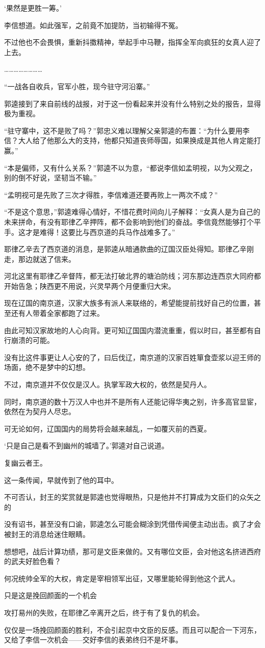 ‘果然是更胜一筹。’

李信想道。如此强军，之前竟不加提防，当初输得不冤。

不过他也不会畏惧，重新抖擞精神，举起手中马鞭，指挥全军向疯狂的女真人迎了上去。

……………………

“一战各自收兵，官军小胜，现今驻守河沿寨。”

郭逵接到了来自前线的战报，对于这一份看起来并没有什么特别之处的报告，显得极为重视。

“驻守寨中，这不是败了吗？”郭忠义难以理解父亲郭逵的布置：“为什么要用李信？大人给了他那么大的支持，他都只知道丧师辱国，如果换成是其他人肯定能打赢。”

“本是偏师，又有什么关系？”郭逵不以为意，“都说李信如孟明视，以为父观之，别的倒不好说，坚韧当不输。”

“孟明视可是先败了三次才得胜，李信难道还要再败上一两次不成？”

“不是这个意思，”郭逵难得心情好，不惜花费时间向儿子解释：“女真人是为自己的未来拼命，有没有耶律乙辛押阵，都不会影响到他们的奋战。李信竟然能够打个平手。这才是难得！这要比与西京道的兵马作战难多了。”

耶律乙辛去了西京道的消息，是郭逵从暗通款曲的辽国汉臣处得知。耶律乙辛刚走，那边就送了信来。

河北这里有耶律乙辛督阵，都无法打破北界的塘泊防线；河东那边连西京大同府都开始告急；陕西更不用说，兴灵早两个月便重归大宋。

现在辽国的南京道，汉家大族多有派人来联络的，希望能提前找好自己的位置，甚至还有人带着全家都跑了过来。

由此可知汉家故地的人心向背。更可知辽国国内潜流重重，假以时曰，甚至都有自行崩溃的可能。

没有比这件事更让人心安的了，曰后伐辽，南京道的汉家百姓箪食壶浆以迎王师的场面，绝不是梦中的幻想。

不过，南京道并不仅仅是汉人。执掌军政大权的，依然是契丹人。

同时，南京道的数十万汉人中也并不是所有人还能记得华夷之别，许多高官显宦，依然在为契丹人尽忠。

可无论如何，辽国国内的局势将会越来越乱，一如覆灭前的西夏。

‘只是自己是看不到幽州的城墙了。’郭逵对自己说道。

复幽云者王。

这一条传闻，早就传到了他的耳中。

不可否认，封王的奖赏就是郭逵也觉得眼热，只是他并不打算成为文臣们的众矢之的

没有诏书，甚至没有口谕，郭逵怎么可能会糊涂到凭借传闻便主动出击。疯了才会被封王的消息给迷住眼睛。

想想吧，战后计算功绩，那可是文臣来做的。又有哪位文臣，会对他这名挤进西府的武夫好脸色看？

何况统帅全军的大权，肯定是宰相领军出征，又哪里能轮得到他这个武人。

只是这是挽回颜面的一个机会

攻打易州的失败，在耶律乙辛离开之后，终于有了复仇的机会。

仅仅是一场挽回颜面的胜利，不会引起京中文臣的反感。而且可以配合一下河东，又给了李信一次机会——交好李信的表弟终归不是坏事。
